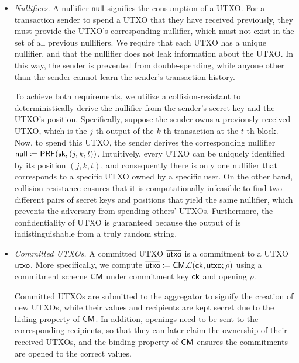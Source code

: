 \begin{itemize}
    \item \textit{Nullifiers.}
    A nullifier $\mathsf{null}$ signifies the consumption of a \ac{UTXO}.
    For a transaction sender to spend a \ac{UTXO} that they have received previously, 
    they must provide the \ac{UTXO}'s corresponding nullifier, which must not exist in the set of all previous nullifiers.
    We require that each \ac{UTXO} has a unique nullifier, and that the nullifier does not leak information about the \ac{UTXO}.
    In this way, the sender is prevented from double-spending, while anyone other than the sender cannot learn the sender's transaction history.

    To achieve both requirements, we utilize a collision-resistant \PRF to deterministically derive the nullifier from the sender's secret key \Sk and the \ac{UTXO}'s position.
    Specifically, suppose the sender owns a previously received \ac{UTXO}, which is the $j$-th output of the $k$-th transaction at the $t$-th block.
    Now, to spend this \ac{UTXO}, the sender derives the corresponding nullifier $\mathsf{null} \coloneqq \mathsf{PRF}({\mathsf{sk}}, (j, k, t))$.
    Intuitively, every \ac{UTXO} can be uniquely identified by its position $(j, k, t)$, and consequently there is only one nullifier that corresponds to a specific \ac{UTXO} owned by a specific user.
    On the other hand, collision resistance ensures that it is computationally infeasible to find two different pairs of secret keys and positions that yield the same nullifier, which prevents the adversary from spending others' \acp{UTXO}.
    Furthermore, the confidentiality of \ac{UTXO} is guaranteed because the output of \PRF is indistinguishable from a truly random string.

    \item \textit{Committed \acp{UTXO}.}
    A committed \ac{UTXO} $\overline{\mathsf{utxo}}$ is a commitment to a \ac{UTXO} $\mathsf{utxo}$.
    More specifically, we compute $\overline{\mathsf{utxo}} \coloneqq \mathsf{\mathsf{CM}.\mathcal{C}}({\mathsf{ck}}, \mathsf{utxo}; \rho)$ using a commitment scheme $\mathsf{CM}$ under commitment key ${\mathsf{ck}}$ and opening $\rho$. 
    
    Committed \acp{UTXO} are submitted to the aggregator to signify the creation of new \acp{UTXO}, while their values and recipients are kept secret due to the hiding property of $\mathsf{CM}$.
    In addition, openings need to be sent to the corresponding recipients, so that they can later claim the ownership of their received \acp{UTXO}, and the binding property of $\mathsf{CM}$ ensures the commitments are opened to the correct values.
\end{itemize}

